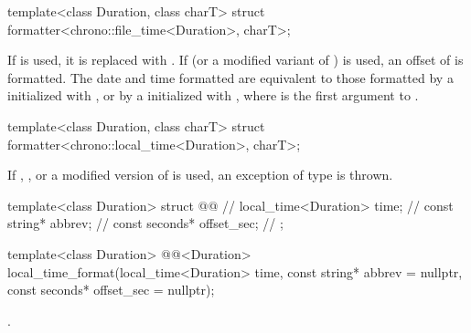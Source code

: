 %
\begin{itemdecl}
template<class Duration, class charT>
  struct formatter<chrono::file_time<Duration>, charT>;
\end{itemdecl}

\begin{itemdescr}
\pnum
\remarks
If  is used,
it is replaced with .
If  (or a modified variant of ) is used,
an offset of  is formatted.
The date and time formatted are equivalent to
those formatted
by a  initialized with , or
by a  initialized with ,
where  is the first argument to .
\end{itemdescr}

%
\begin{itemdecl}
template<class Duration, class charT>
  struct formatter<chrono::local_time<Duration>, charT>;
\end{itemdecl}

\begin{itemdescr}
\pnum
\remarks
If , , or a modified version of  is used,
an exception of type  is thrown.
\end{itemdescr}

%
\begin{codeblock}
template<class Duration> struct @@ {           // \expos
  local_time<Duration> time;                                    // \expos
  const string* abbrev;                                         // \expos
  const seconds* offset_sec;                                    // \expos
};
\end{codeblock}

%
\begin{itemdecl}
template<class Duration>
  @@<Duration>
    local_time_format(local_time<Duration> time, const string* abbrev = nullptr,
                      const seconds* offset_sec = nullptr);
\end{itemdecl}

\begin{itemdescr}
\pnum
\returns
{}.
\end{itemdescr}

